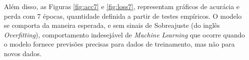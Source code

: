 Além disso, as Figuras \ref{fig:acc7} e \ref{fig:loss7}, representam gráficos de acurácia e perda com 7 épocas, quantidade definida a partir de testes empíricos. O modelo se comporta da maneira esperada, e sem sinais de Sobreajuste (do inglês \textit{Overfitting}), comportamento indesejável de \textit{Machine Learning} que ocorre quando o modelo fornece previsões precisas para dados de treinamento, mas não para novos dados. 






